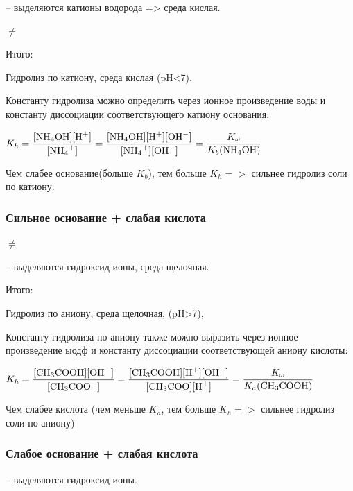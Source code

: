  -- выделяются катионы водорода => среда кислая.

 $\neq$  

Итого:


Гидролиз по катиону, среда кислая (pH<7).

Константу гидролиза можно определить  через ионное произведение воды и константу диссоциации соответствующего катиону основания:

$\displaystyle K_h = \frac{[\ce{NH4OH}][\ce{H+}]}{[\ce{NH4+}]} = \frac{[\ce{NH4OH}][\ce{H+}][\ce{OH-}]}{[\ce{NH4+}][\ce{OH-}]}=\frac{K_\omega}{K_b(\ce{NH4OH})}$

Чем слабее основание(больше $K_b$), тем больше $K_h =>$ сильнее гидролиз соли по катиону.

\subsubsection{Сильное основание + слабая кислота}


 $\neq$

 -- выделяются гидроксид-ионы, среда щелочная.

Итого:


Гидролиз по аниону, среда щелочная, (pH>7),

Константу гидролиза по аниону также можно выразить через ионное произведение ыодф и константу диссоциации соответствующей аниону кислоты:

$\displaystyle K_h = \frac{[\ce{CH3COOH}][\ce{OH-}]}{[\ce{CH3COO-}]} = \frac{[\ce{CH3COOH}][\ce{H+}][\ce{OH-}]}{[\ce{CH3COO}][\ce{H+}]}=\frac{K_\omega}{K_a(\ce{CH3COOH})}$

Чем слабее кислота (чем меньше $K_a$, тем больше $K_h =>$ сильнее гидролиз соли по аниону)
\subsubsection{Слабое основание + слабая кислота}


 -- выделяются гидроксид-ионы.


